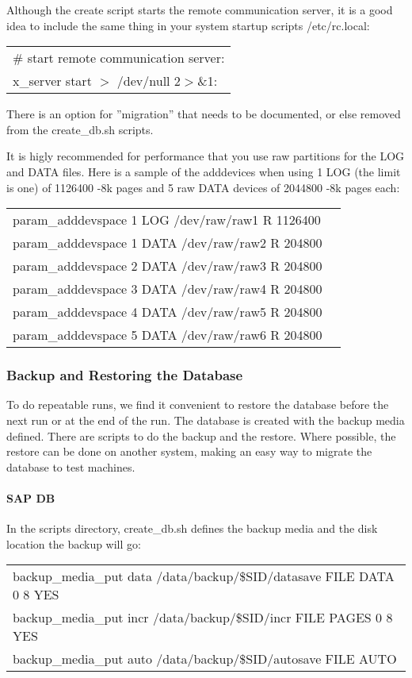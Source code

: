 \documentclass{article}
\begin{document}
Although the create script starts the remote communication server, it is a
good idea to include the same thing in your system startup scripts
/etc/rc.local: \\
\begin{tabular}[c]{l}
\# start remote communication server: \\
x\_server start $>$ /dev/null 2$>$\&1: \\
\end{tabular}

There is an option for ''migration'' that needs to be documented, or else
removed from the create\_db.sh scripts.

It is higly recommended for performance that you use raw partitions for the
LOG and DATA files.  Here is a sample of the adddevices when using 1 LOG (the
limit is one)  of 1126400 -8k pages and 5 raw DATA devices of 2044800 -8k
pages each: \\
\begin{tabular}[c]{ll}
param\_adddevspace 1 LOG  /dev/raw/raw1 R 1126400 \\
param\_adddevspace 1 DATA /dev/raw/raw2 R 204800 \\
param\_adddevspace 2 DATA /dev/raw/raw3 R 204800 \\
param\_adddevspace 3 DATA /dev/raw/raw4 R 204800 \\
param\_adddevspace 4 DATA /dev/raw/raw5 R 204800 \\
param\_adddevspace 5 DATA /dev/raw/raw6 R 204800 \\
\end{tabular}

\subsubsection{Backup and Restoring the Database}

To do repeatable runs, we find it convenient to restore the database before
the next run or at the end of the run.  The database is created with the
backup media defined.  There are scripts to do the backup and the restore.
Where possible, the restore can be done on another system, making an easy way
to migrate the database to test machines.

\paragraph{SAP DB}

In the scripts directory, create\_db.sh defines the backup media and the disk
location the backup will go: \\
\begin{tabular}[c]{l}
backup\_media\_put data /data/backup/\$SID/datasave FILE DATA 0 8 YES \\
backup\_media\_put incr /data/backup/\$SID/incr FILE PAGES 0 8 YES \\
backup\_media\_put auto /data/backup/\$SID/autosave FILE AUTO \\
\end{tabular}
\end{document}

